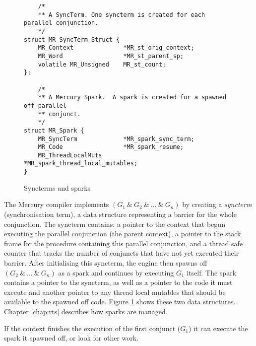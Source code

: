 \begin{figure}
\begin{verbatim}
    /*
    ** A SyncTerm. One syncterm is created for each parallel conjunction.
    */
struct MR_SyncTerm_Struct {
    MR_Context              *MR_st_orig_context;
    MR_Word                 *MR_st_parent_sp;
    volatile MR_Unsigned    MR_st_count;
};

    /*
    ** A Mercury Spark.  A spark is created for a spawned off parallel
    ** conjunct.
    */
struct MR_Spark {
    MR_SyncTerm             *MR_spark_sync_term;
    MR_Code                 *MR_spark_resume;
    MR_ThreadLocalMuts      *MR_spark_thread_local_mutables;
}
\end{verbatim}
\caption{Syncterms and sparks}
\label{fig:spark_and_syncterm}
\end{figure}

The Mercury compiler implements $(G_1~\&~G_2~\&~\ldots~\&~G_n)$
by creating a \emph{syncterm} (synchronisation term), a data structure
representing a barrier for the whole conjunction.
The syncterm contains:
a pointer to the context that begun executing the parallel conjunction
(the parent context),
a pointer to the stack frame for the procedure containing this parallel
conjunction,
and a thread safe counter that tracks the number of conjuncts that have not
yet executed their barrier.
After initialising this syncterm, the engine then
spawns off $(G_2~\&~\ldots~\&~G_n)$ as a spark and continues by executing
$G_1$ itself.
The spark contains a pointer to the syncterm,
as well as a pointer to the code it must execute
and another pointer to any thread local mutables that should be available to the
spawned off code.
Figure \ref{fig:spark_and_syncterm} shows these two data structures.
Chapter \ref{chap:rts} describes how sparks are managed.

If the context finishes the execution of the first conjunct ($G_1$)
it can execute the spark it spawned off, or look for other work.

